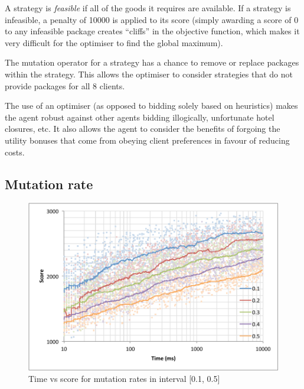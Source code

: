 \documentclass[a4paper]{proc}
\begin{document}
A strategy is \emph{feasible} if all of the goods it requires are available. If a strategy is infeasible, a penalty of 10000 is applied to its score (simply awarding a score of 0 to any infeasible package creates ``cliffs'' in the objective function, which makes it very difficult for the optimiser to find the global maximum).

The mutation operator for a strategy has a chance to remove or replace packages within the strategy. This allows the optimiser to consider strategies that do not provide packages for all 8 clients.

The use of an optimiser (as opposed to bidding solely based on heuristics) makes the agent robust against other agents bidding illogically, unfortunate hotel closures, etc. It also allows the agent to consider the benefits of forgoing the utility bonuses that come from obeying client preferences in favour of reducing costs.

\subsection{Mutation rate}

\begin{figure}
  \includegraphics[width=\linewidth]{mutation_rate_1.pdf}
  \caption{Time vs score for mutation rates in interval [0.1, 0.5]}
  \label{fig:mutation_rate_1}
\end{figure}
\end{document}
